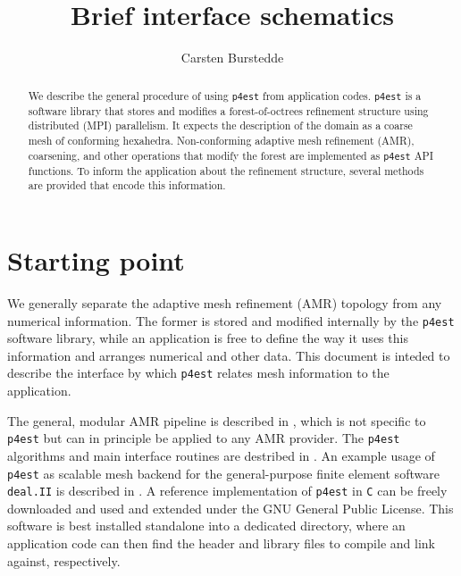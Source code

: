 \documentclass[letterpaper,11pt]{article}
\author{Carsten Burstedde}
\title{Brief \pforest interface schematics}
\newcommand{\dealii}{\texttt{deal.II}\xspace}
\newcommand{\pforest}{\texttt{p4est}\xspace}
\begin{document}
\maketitle

\begin{abstract}
We describe the general procedure of using \pforest from application codes.
\pforest is a software library that stores and modifies a forest-of-octrees
refinement structure using distributed (MPI) parallelism.  It expects the
description of the domain as a coarse mesh of conforming hexahedra.
Non-conforming adaptive mesh refinement (AMR), coarsening, and other operations
that modify the forest are implemented as \pforest API functions.  To inform
the application about the refinement structure, several methods are provided
that encode this information.
\end{abstract}

\section{Starting point}

We generally separate the adaptive mesh refinement (AMR) topology from any
numerical information.  The former is stored and modified internally by the
\pforest software library, while an application is free to define the way it
uses this information and arranges numerical and other data.  This document is
inteded to describe the interface by which \pforest relates mesh information
to the application.

The general, modular AMR pipeline is described in
\cite{BursteddeGhattasStadlerEtAl08}, which is not specific to \pforest but can
in principle be applied to any AMR provider.  The \pforest algorithms and main
interface routines are destribed in \cite{BursteddeWilcoxGhattas11}.
An example usage of \pforest as scalable mesh backend for the general-purpose
finite element software \dealii is described in
\cite{BangerthBursteddeHeisterEtAl11}.  A reference implementation of \pforest
in \texttt{C} can be freely downloaded \cite{Burstedde10} and used and extended
under the GNU General Public License.  This software is best installed
standalone into a dedicated directory, where an application code can then find
the header and library files to compile and link against, respectively.
\end{document}

